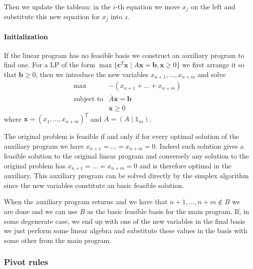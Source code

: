 \documentclass[12pt]{extarticle}
\renewcommand{\vec}[1]{\bm{#1}}
\begin{document}
Then we update the tableau: in the $i$-th equation we move $x_j$ on the left and substitute this new
equation for $x_j$ into $z$.

\paragraph{Initialization}
If the linear program has no  feasible basis we construct an auxiliary program to find
one.
For a LP of the form $\max \{ \vec c^T \vec x \mid A \vec x = \vec b, \vec x \geq 0 \}$ we first
arrange it so that $\vec b \geq 0$, then we introduce the new variables $x_{n+1}, \dots, x_{n+m}$
and solve
\begin{equation}
	\begin{array}{ll}
		\max              & -(x_{n+1} + \dots + x_{n+m})           \\
		\text{subject to} & \overline A \overline{\vec x} = \vec b \\
		                  & \overline{\vec x} \geq 0
	\end{array}
\end{equation}
where $\overline{\vec x} = (x_1, \dots, x_{n+m})^T$ and $\overline A = (A \mid \mathds 1_m)$.

The original problem is feasible if and only if for every optimal solution of the auxiliary program
we have $x_{n+1} = \dots = x_{n + m} = 0$.
Indeed such solution gives a feasible solution to the original linear program and conversely any
solution to the original problem has $x_{n+1} = \dots = x_{n + m} = 0$ and is therefore optimal in
the auxiliary.
This auxiliary program can be solved directly by the simplex algorithm since the new variables
constitute an basic feasible solution.

When the auxiliary program returns and we have that $n+1, \dots, n+m \notin B$ we are done and we
can use $B$ as the basic feasible basis for the main program. If, in some degenerate case, we end up
with one of the new variables in the final basis we just perform some linear algebra and substitute
these values in the basis with some other from the main program.

\subsubsection{Pivot rules}
\end{document}

